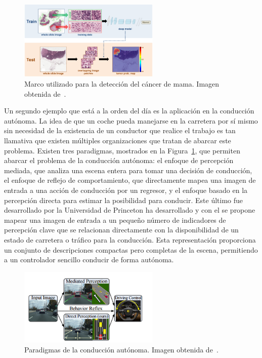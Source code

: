 \begin{figure}[H]
	\begin{center}
		\includegraphics[width=0.6\textwidth]{figures/cancer}
		\caption{Marco utilizado para la detección del cáncer de mama. Imagen obtenida de~\cite{2016arXiv160605718W}.}
	\end{center}
\end{figure}

Un segundo ejemplo que está a la orden del día es la aplicación en la conducción autónoma. La idea de que un coche pueda manejarse en la carretera por sí mismo sin necesidad de la existencia de un conductor que realice el trabajo es tan llamativa que existen múltiples organizaciones que tratan de abarcar este problema. Existen tres paradigmas, mostrados en la Figura~\ref{fig.conduccion}, que permiten abarcar el problema de la conducción autónoma: el enfoque de percepción mediada, que analiza una escena entera para tomar una decisión de conducción, el enfoque de reflejo de comportamiento, que directamente mapea una imagen de entrada a una acción de conducción por un regresor, y el enfoque basado en la percepción directa para estimar la posibilidad para conducir. Este último fue desarrollado por la Universidad de Princeton ha desarrollado y con el se propone mapear una imagen de entrada a un pequeño número de indicadores de percepción clave que se relacionan directamente con la disponibilidad de un estado de carretera o tráfico para la conducción. Esta representación proporciona un conjunto de descripciones compactas pero completas de la escena, permitiendo a un controlador sencillo conducir de forma autónoma.

\begin{figure}[H]
	\begin{center}
		\includegraphics[width=0.6\textwidth]{figures/conduccion}
		\caption{Paradigmas de la conducción autónoma. Imagen obtenida de~\cite{2015arXiv150500256C}.}
		\label{fig.conduccion}
	\end{center}
\end{figure}

